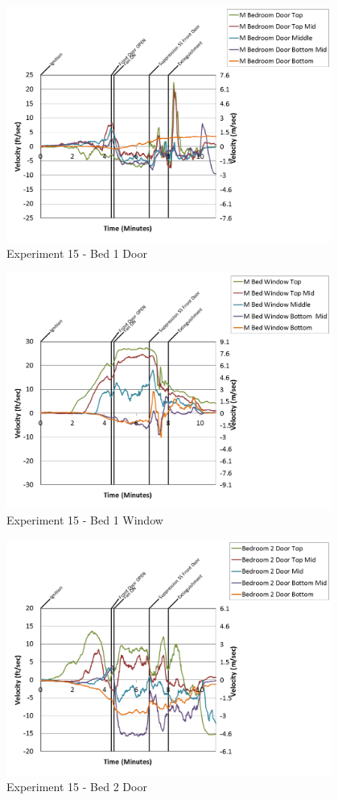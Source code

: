\documentclass{article}
\begin{document}
\begin{appendices}
\clearpage

\begin{figure}[h!]
	\centering
	\includegraphics[height=3.05in]{0_Images/Results_Charts/Exp_15_Charts/Bed1Door.png}
	\caption{Experiment 15 - Bed 1 Door}
\end{figure}


\begin{figure}[h!]
	\centering
	\includegraphics[height=3.05in]{0_Images/Results_Charts/Exp_15_Charts/Bed1Window.png}
	\caption{Experiment 15 - Bed 1 Window}
\end{figure}

\clearpage

\begin{figure}[h!]
	\centering
	\includegraphics[height=3.05in]{0_Images/Results_Charts/Exp_15_Charts/Bed2Door.png}
	\caption{Experiment 15 - Bed 2 Door}
\end{figure}



\end{appendices}
\end{document}
